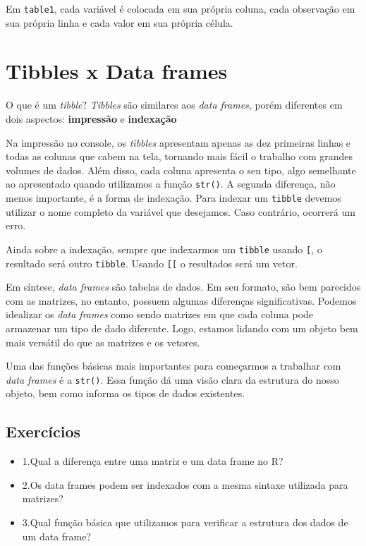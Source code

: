\documentclass[]{book}
\providecommand{\tightlist}{%
  \setlength{\itemsep}{0pt}\setlength{\parskip}{0pt}}
\begin{document}
Em \texttt{table1}, cada variável é colocada em sua própria coluna, cada observação em sua própria linha e cada valor em sua própria célula.

\hypertarget{tibbles-x-data-frames}{%
\section{Tibbles x Data frames}\label{tibbles-x-data-frames}}

O que é um \emph{tibble}? \emph{Tibbles} são similares aos \emph{data frames}, porém diferentes em dois aspectos: \textbf{impressão} e \textbf{indexação}

Na impressão no console, os \emph{tibbles} apresentam apenas as dez primeiras linhas e todas as colunas que cabem na tela, tornando mais fácil o trabalho com grandes volumes de dados. Além disso, cada coluna apresenta o seu tipo, algo semelhante ao apresentado quando utilizamos a função \texttt{str()}. A segunda diferença, não menos importante, é a forma de indexação. Para indexar um \texttt{tibble} devemos utilizar o nome completo da variável que desejamos. Caso contrário, ocorrerá um erro.

Ainda sobre a indexação, sempre que indexarmos um \texttt{tibble} usando \texttt{{[}}, o resultado será outro \texttt{tibble}. Usando \texttt{{[}{[}} o resultados será um vetor.

Em síntese, \emph{data frames} são tabelas de dados. Em seu formato, são bem parecidos com as matrizes, no entanto, possuem algumas diferenças significativas. Podemos idealizar os \emph{data frames} como sendo matrizes em que cada coluna pode armazenar um tipo de dado diferente. Logo, estamos lidando com um objeto bem mais versátil do que as matrizes e os vetores.

Uma das funções básicas mais importantes para começarmos a trabalhar com \emph{data frames} é a \texttt{str()}. Essa função dá uma visão clara da estrutura do nosso objeto, bem como informa os tipos de dados existentes.

\hypertarget{exercuxedcios}{%
\subsection{Exercícios}\label{exercuxedcios}}

\begin{itemize}
\tightlist
\item
  1.Qual a diferença entre uma matriz e um data frame no R?
\item
  2.Os data frames podem ser indexados com a mesma sintaxe utilizada para matrizes?
\item
  3.Qual função básica que utilizamos para verificar a estrutura dos dados de um data frame?
\end{itemize}
\end{document}
